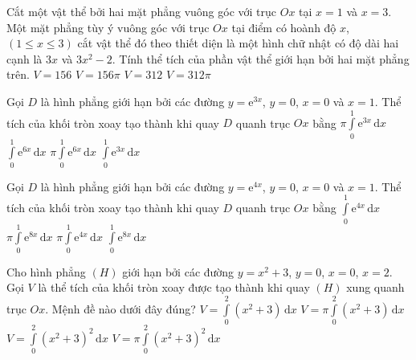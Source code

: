 \begin{ex}%
Cắt một vật thể bởi hai mặt phẳng vuông góc với trục $O x$ tại $x=1$ và $x=3$. Một mặt phẳng tùy ý vuông góc với trục $O x$ tại điểm có hoành độ $x$, $(1 \leq x \leq 3)$ cắt vật thể đó theo thiết diện là một hình chữ nhật có độ dài hai cạnh là $3 x$ và $3 x^2-2$. Tính thể tích của phần vật thể giới hạn bởi hai mặt phẳng trên.
\choice
{\True $V=156$}
{$V=156 \pi$}
{$ V=312 $}
{$V=312 \pi$}
\end{ex}

\begin{ex}%
Gọi $D$ là hình phẳng giới hạn bởi các đường $y=\mathrm{e}^{3 x}$, $y=0$, $x=0$ và $x=1$. Thể tích của khối tròn xoay tạo thành khi quay $D$ quanh trục $O x$ bằng
\choice
{$\pi \displaystyle\int\limits_0^1 \mathrm{e}^{3 x} \mathrm{\,d} x$}
{$\displaystyle\int\limits_0^1 \mathrm{e}^{6 x} \mathrm{\,d} x$}
{\True $\pi \displaystyle\int\limits_0^1 \mathrm{e}^{6 x} \mathrm{\,d} x$}
{$\displaystyle\int\limits_0^1 \mathrm{e}^{3 x} \mathrm{\,d} x$}
\end{ex}

\begin{ex}%
Gọi $D$ là hình phẳng giới hạn bởi các đường $y=\mathrm{e}^{4 x}$, $y=0$, $x=0$ và $x=1$. Thể tích của khối tròn xoay tạo thành khi quay $D$ quanh trục $O x$ bằng
\choice
{$\displaystyle\int\limits_0^1 \mathrm{e}^{4 x} \mathrm{\,d} x$}
{\True $\pi \displaystyle\int\limits_0^1 \mathrm{e}^{8 x} \mathrm{\,d} x$}
{$\pi \displaystyle\int\limits_0^1 \mathrm{e}^{4 x} \mathrm{\,d} x$}
{$\displaystyle\int\limits_0^1 \mathrm{e}^{8 x} \mathrm{\,d} x$}
\end{ex}

\begin{ex}%
Cho hình phẳng $(H)$ giới hạn bởi các đường $y=x^2+3$, $y=0$, $x=0$, $x=2$. Gọi $V$ là thể tích của khối tròn xoay được tạo thành khi quay $(H)$ xung quanh trục $O x$. Mệnh đề nào dưới đây đúng?
\choice
{$V=\displaystyle\int\limits_0^2\left(x^2+3\right) \mathrm{\,d}x$}
{$V=\pi \displaystyle\int\limits_0^2\left(x^2+3\right) \mathrm{\,d}x$}
{$V=\displaystyle\int\limits_0^2\left(x^2+3\right)^2 \mathrm{\,d}x$}
{\True $V=\pi \displaystyle\int\limits_0^2\left(x^2+3\right)^2 \mathrm{\,d}x$}
\end{ex}

